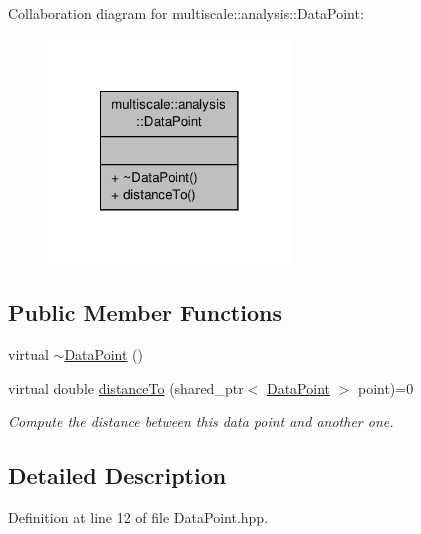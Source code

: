 Collaboration diagram for multiscale\-:\-:analysis\-:\-:Data\-Point\-:\nopagebreak
\begin{figure}[H]
\begin{center}
\leavevmode
\includegraphics[width=182pt]{classmultiscale_1_1analysis_1_1DataPoint__coll__graph}
\end{center}
\end{figure}
\subsection*{Public Member Functions}
\begin{DoxyCompactItemize}
\item 
virtual \hyperlink{classmultiscale_1_1analysis_1_1DataPoint_ab7a7d2baf190376980cd3c2e130a9905}{$\sim$\-Data\-Point} ()
\item 
virtual double \hyperlink{classmultiscale_1_1analysis_1_1DataPoint_a8dd5def96eab756085461e8f6a201dce}{distance\-To} (shared\-\_\-ptr$<$ \hyperlink{classmultiscale_1_1analysis_1_1DataPoint}{Data\-Point} $>$ point)=0
\begin{DoxyCompactList}\small\item\em Compute the distance between this data point and another one. \end{DoxyCompactList}\end{DoxyCompactItemize}


\subsection{Detailed Description}


Definition at line 12 of file Data\-Point.\-hpp.




